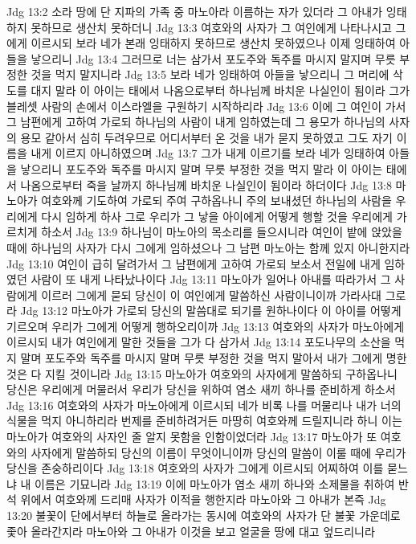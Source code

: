 Jdg 13:2  소라 땅에 단 지파의 가족 중 마노아라 이름하는 자가 있더라 그 아내가 잉태하지 못하므로 생산치 못하더니
Jdg 13:3  여호와의 사자가 그 여인에게 나타나시고 그에게 이르시되 보라 네가 본래 잉태하지 못하므로 생산치 못하였으나 이제 잉태하여 아들을 낳으리니
Jdg 13:4  그러므로 너는 삼가서 포도주와 독주를 마시지 말지며 무릇 부정한 것을 먹지 말지니라
Jdg 13:5  보라 네가 잉태하여 아들을 낳으리니 그 머리에 삭도를 대지 말라 이 아이는 태에서 나옴으로부터 하나님께 바치운 나실인이 됨이라 그가 블레셋 사람의 손에서 이스라엘을 구원하기 시작하리라
Jdg 13:6  이에 그 여인이 가서 그 남편에게 고하여 가로되 하나님의 사람이 내게 임하였는데 그 용모가 하나님의 사자의 용모 같아서 심히 두려우므로 어디서부터 온 것을 내가 묻지 못하였고 그도 자기 이름을 내게 이르지 아니하였으며
Jdg 13:7  그가 내게 이르기를 보라 네가 잉태하여 아들을 낳으리니 포도주와 독주를 마시지 말며 무릇 부정한 것을 먹지 말라 이 아이는 태에서 나옴으로부터 죽을 날까지 하나님께 바치운 나실인이 됨이라 하더이다
Jdg 13:8  마노아가 여호와께 기도하여 가로되 주여 구하옵나니 주의 보내셨던 하나님의 사람을 우리에게 다시 임하게 하사 그로 우리가 그 낳을 아이에게 어떻게 행할 것을 우리에게 가르치게 하소서
Jdg 13:9  하나님이 마노아의 목소리를 들으시니라 여인이 밭에 앉았을 때에 하나님의 사자가 다시 그에게 임하셨으나 그 남편 마노아는 함께 있지 아니한지라
Jdg 13:10  여인이 급히 달려가서 그 남편에게 고하여 가로되 보소서 전일에 내게 임하였던 사람이 또 내게 나타났나이다
Jdg 13:11  마노아가 일어나 아내를 따라가서 그 사람에게 이르러 그에게 묻되 당신이 이 여인에게 말씀하신 사람이니이까 가라사대 그로라
Jdg 13:12  마노아가 가로되 당신의 말씀대로 되기를 원하나이다 이 아이를 어떻게 기르오며 우리가 그에게 어떻게 행하오리이까
Jdg 13:13  여호와의 사자가 마노아에게 이르시되 내가 여인에게 말한 것들을 그가 다 삼가서
Jdg 13:14  포도나무의 소산을 먹지 말며 포도주와 독주를 마시지 말며 무릇 부정한 것을 먹지 말아서 내가 그에게 명한 것은 다 지킬 것이니라
Jdg 13:15  마노아가 여호와의 사자에게 말씀하되 구하옵나니 당신은 우리에게 머물러서 우리가 당신을 위하여 염소 새끼 하나를 준비하게 하소서
Jdg 13:16  여호와의 사자가 마노아에게 이르시되 네가 비록 나를 머물리나 내가 너의 식물을 먹지 아니하리라 번제를 준비하려거든 마땅히 여호와께 드릴지니라 하니 이는 마노아가 여호와의 사자인 줄 알지 못함을 인함이었더라
Jdg 13:17  마노아가 또 여호와의 사자에게 말씀하되 당신의 이름이 무엇이니이까 당신의 말씀이 이룰 때에 우리가 당신을 존숭하리이다
Jdg 13:18  여호와의 사자가 그에게 이르시되 어찌하여 이를 묻느냐 내 이름은 기묘니라
Jdg 13:19  이에 마노아가 염소 새끼 하나와 소제물을 취하여 반석 위에서 여호와께 드리매 사자가 이적을 행한지라 마노아와 그 아내가 본즉
Jdg 13:20  불꽃이 단에서부터 하늘로 올라가는 동시에 여호와의 사자가 단 불꽃 가운데로 좇아 올라간지라 마노아와 그 아내가 이것을 보고 얼굴을 땅에 대고 엎드리니라
